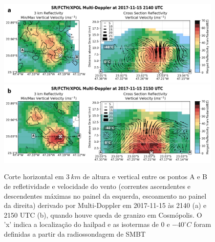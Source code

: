 \begin{figure}[htb]
	\centering
	\caption{Corte horizontal em $3\:km$ de altura e vertical entre os pontos A e B de refletividade e velocidade do vento (correntes ascendentes e descendentes máximas no painel da esquerda, escoamento no painel da direita) derivado por Multi-Doppler em 2017-11-15 às 2140 (a) e 2150 UTC (b), quando houve queda de granizo em Cosmópolis. O 'x' indica a localização do hailpad e as isotermas de $0$ e $-40^{\circ}C$ foram definidas a partir da radiossondagem de SMBT} 
	\label{doppler_20171115}
	\vspace{-5pt}
	\includegraphics[width=\columnwidth]{../MultiDoppler_Processing/figures/SR-FCTH-XPOL 2017-11-15 2140 UTC.png} \\
	\vspace{-5pt}
	\includegraphics[width=\columnwidth]{../MultiDoppler_Processing/figures/SR-FCTH-XPOL 2017-11-15 2150 UTC.png} \\
\end{figure}
